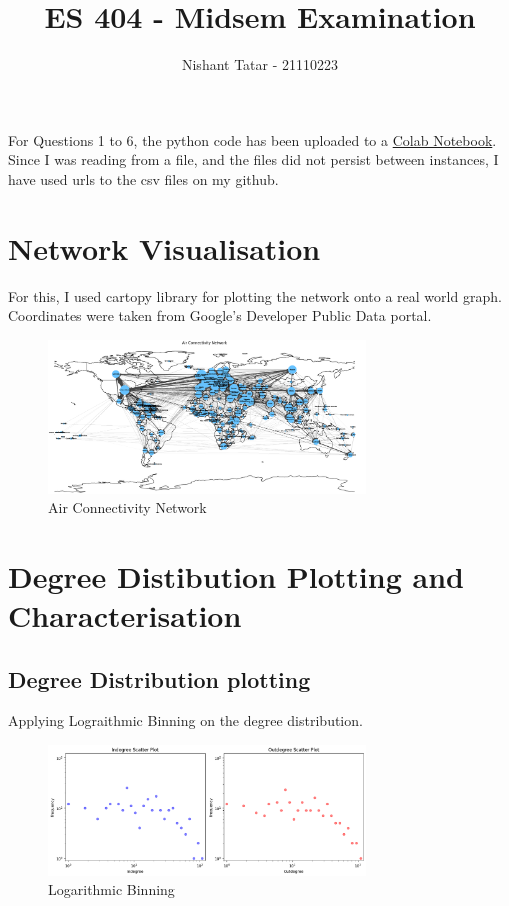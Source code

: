 \documentclass[11pt]{article}
\title{ES 404 - Midsem Examination}
\date{}
\author{Nishant Tatar - 21110223}
\begin{document}
\maketitle

For Questions 1 to 6, the python code has been uploaded to a \href{https://colab.research.google.com/drive/13LGfweQzj7sSejKYgvT02PPBfOn1-AWh?usp=sharing}{Colab Notebook}. Since I was reading from a file, and the files did not persist between instances, I have used urls to the csv files on my github.

\section{Network Visualisation}
For this, I used cartopy library for plotting the network onto a real world graph. Coordinates were taken from Google's Developer Public Data portal.

\begin{figure}[h]
    \centering
    \includegraphics[width=0.75\textwidth]{geocodenetwork.png} %
    \caption{Air Connectivity Network}
\end{figure}

\section{Degree Distibution Plotting and Characterisation}
\subsection{Degree Distribution plotting}
Applying Lograithmic Binning on the degree distribution.
\begin{figure}[h]
    \centering
    \includegraphics[width=0.75\textwidth]{logbinneddegplot.png} %
    \caption{Logarithmic Binning}
\end{figure}
\end{document}

